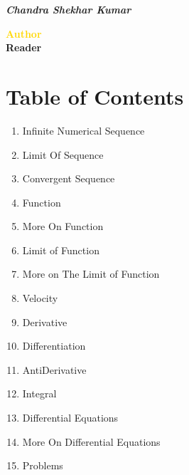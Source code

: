 \thispagestyle{empty}

\vspace{3mm}

  \hfill \emph{\color{Sepia} \textbf{Chandra Shekhar Kumar}}


\begin{center}\bfseries \large
\textcolor{Gold}{Author}  \\
\textcolor{BurntOrange}{Reader} 
\end{center}

\section{Table of Contents}
\begin{enumerate}[nosep]
\item Infinite Numerical Sequence
\item Limit Of Sequence
\item Convergent Sequence 
\item Function
\item More On Function
\item Limit of Function
\item More on The Limit of Function
\item Velocity
\item Derivative
\item Differentiation
\item AntiDerivative
\item Integral
\item Differential Equations
\item More On Differential Equations
\item Problems
\end{enumerate}

\hrulefill

